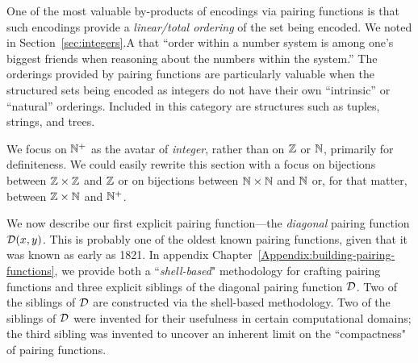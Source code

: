 \medskip


One of the most valuable by-products of encodings via pairing functions is that such encodings provide a {\em linear/total ordering} of the set being encoded.  We noted in Section~\ref{sec:integers}.A that ``order within a number system is among one's biggest friends when reasoning about the numbers within the system.''  The orderings provided by pairing functions are particularly valuable when the structured sets being encoded as integers do not have their own ``intrinsic'' or ``natural'' orderings.  Included in this category are structures such as tuples, strings, and trees.

\bigskip

\noindent {}
\bigskip

We focus on $\mathbb{N}^+$ as the avatar of {\it integer}, rather than on $\mathbb{Z}$ or $\mathbb{N}$, primarily for definiteness.  We could easily rewrite this section with a focus on bijections between $\mathbb{Z} \times \mathbb{Z}$ and $\mathbb{Z}$ or on bijections between $\mathbb{N} \times \mathbb{N}$ and $\mathbb{N}$ or, for that matter, between $\mathbb{Z} \times \mathbb{N}$ and $\mathbb{N}^+$.

\bigskip

We now describe our first explicit pairing function---the {\em diagonal} pairing function $\mbox{$\cal D$}(x,y)$.  This is probably one of the oldest known pairing functions, given that it was known as early as 1821.   In appendix Chapter~\ref{Appendix:building-pairing-functions}, we provide both a ``{\em shell-based}" methodology for crafting pairing functions and three explicit siblings of the diagonal pairing function $\mbox{$\cal D$}$.  Two of the siblings of $\mbox{$\cal D$}$ are constructed via the shell-based methodology.  Two of the siblings of $\mbox{$\cal D$}$ were invented for their usefulness in certain computational domains; the third sibling was invented to uncover an inherent limit on the ``compactness" of pairing functions.


\medskip

